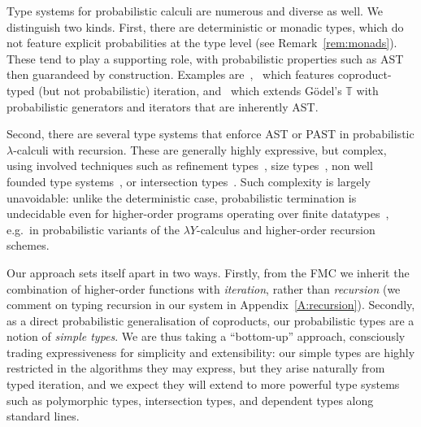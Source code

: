 \documentclass[a4paper,UKenglish,cleveref, autoref, thm-restate]{lipics-v2021}
\begin{document}
Type systems for probabilistic calculi are numerous and diverse as well. We distinguish two kinds. First, there are deterministic or monadic types, which do not feature explicit probabilities at the type level (see Remark~\ref{rem:monads}). These tend to play a supporting role, with probabilistic properties such as AST then guarandeed by construction. Examples are~\cite{TorrezRuiz-Piedeleu-Silva-Zanasi-2024},~\cite{Staton-2017} which features coproduct-typed (but not probabilistic) iteration, and~\cite{Breuvart-DalLago-Herrou-2021} which extends G\"odel's $\mathbb{T}$ with probabilistic generators and iterators that are inherently AST.

Second, there are several type systems that enforce AST or PAST in probabilistic $\lambda$-calculi with recursion. These are generally highly expressive, but complex, using involved techniques such as refinement types~\cite{Avanzini-DalLago-Ghyselen-2019}, size types~\cite{DalLago-Grellois-2019}, non well founded type systems~\cite{DalLago-Padovani-2024,Das-Wang-Hoffmann-2023}, or intersection types~\cite{Beutner-Ong-2021,DalLago-Faggian-Ronchi-2021}. Such complexity is largely unavoidable: unlike the deterministic case, probabilistic termination is undecidable even for higher-order programs operating over finite datatypes~\cite{Kobayashi-DalLago-Grellois-2020}, e.g.\ in probabilistic variants of the $\lambda Y$-calculus and higher-order recursion schemes.


Our approach sets itself apart in two ways. Firstly, from the FMC we inherit the combination of higher-order functions with \emph{iteration}, rather than \emph{recursion} (we comment on typing recursion in our system in Appendix~\ref{A:recursion}). Secondly, as a direct probabilistic generalisation of coproducts, our probabilistic types are a notion of \emph{simple types}. We are thus taking a ``bottom-up'' approach, consciously trading expressiveness for simplicity and extensibility: our simple types are highly restricted in the algorithms they may express, but they arise naturally from typed iteration, and we expect they will extend to more powerful type systems such as polymorphic types, intersection types, and dependent types along standard lines.

\end{document}
